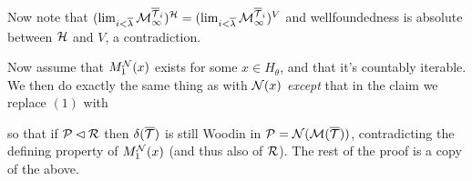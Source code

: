 \documentclass[../../main]{subfiles}
\begin{document}
{  Now note that $(\lim_{i<\overline\lambda}\M^{\overline\T_i}_\infty)^{\h}=(\lim_{i<\overline\lambda}\M^{\overline\T_i}_\infty)^V$ and wellfoundedness is absolute between $\h$ and $V$, a contradiction.
    
  \qquad Now assume that $M_1^{\N}(x)$ exists for some $x\in H_\theta$, and that it's countably iterable. We then do exactly the same thing as with $\N(x)$ \textit{except} that in the claim we replace $(1)$ with

  so that if $\P\pinit\R$ then $\delta(\overline\T)$ is still Woodin in $\P=\N(\M(\overline\T))$, contradicting the defining property of $M_1^{\N}(x)$ (and thus also of $\R$). The rest of the proof is a copy of the above.
}
\end{document}
